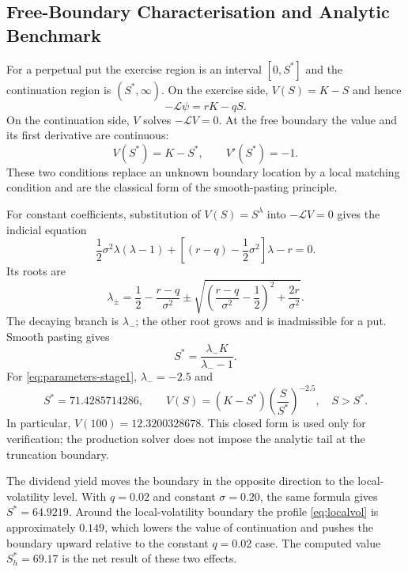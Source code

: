 \documentclass[11pt,a4paper]{article}
\theoremstyle{definition}
\theoremstyle{remark}
\begin{document}
\subsection{Free-Boundary Characterisation and Analytic Benchmark}
For a perpetual put the exercise region is an interval $[0,S^*]$ and the
continuation region is $(S^*,\infty)$. On the exercise side,
$V(S)=K-S$ and hence
\begin{equation}
    -\mathcal{L}\psi
    =rK-qS.
    \label{eq:exercise-operator}
\end{equation}
On the continuation side, $V$ solves $-\mathcal{L}V=0$. At the free boundary
the value and its first derivative are continuous:
\begin{equation}
    V(S^*)=K-S^*,
    \qquad
    V'(S^*)=-1.
    \label{eq:smooth-pasting}
\end{equation}
These two conditions replace an unknown boundary location by a local
matching condition and are the classical form of the smooth-pasting
principle.

For constant coefficients, substitution of $V(S)=S^\lambda$ into
$-\mathcal{L}V=0$ gives the indicial equation
\begin{equation}
    \frac12\sigma^2\lambda(\lambda-1)
    +\left[(r-q)-\frac12\sigma^2\right]\lambda-r=0.
    \label{eq:indicial}
\end{equation}
Its roots are
\begin{equation}
    \lambda_{\pm}
    =\frac12-\frac{r-q}{\sigma^2}
    \pm\sqrt{\left(\frac{r-q}{\sigma^2}-\frac12\right)^2
    +\frac{2r}{\sigma^2}}.
    \label{eq:roots}
\end{equation}
The decaying branch is $\lambda_-$; the other root grows and is inadmissible
for a put. Smooth pasting gives
\begin{equation}
    S^*=\frac{\lambda_-K}{\lambda_--1}.
    \label{eq:exactboundary}
\end{equation}
For \eqref{eq:parameters-stage1}, $\lambda_-=-2.5$ and
\begin{equation}
    S^*=71.4285714286,
    \qquad
    V(S)=(K-S^*)\left(\frac{S}{S^*}\right)^{-2.5},
    \quad S>S^*.
    \label{eq:exactvalue}
\end{equation}
In particular, $V(100)=12.3200328678$. This closed form is used only for
verification; the production solver does not impose the analytic tail at the
truncation boundary.

The dividend yield moves the boundary in the opposite direction to the
local-volatility level. With $q=0.02$ and constant $\sigma=0.20$, the same
formula gives $S^*=64.9219$. Around the local-volatility boundary the profile
\eqref{eq:localvol} is approximately $0.149$, which lowers the value of
continuation and pushes the boundary upward relative to the constant
$q=0.02$ case. The computed value $S_h^*=69.17$ is the net result of these
two effects.
\end{document}

